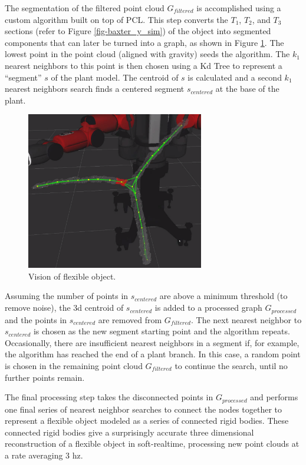 \documentclass[runningheads,a4paper]{llncs}
\begin{document}
The segmentation of the filtered point cloud $G_{filtered}$ is accomplished using a custom algorithm built on top of PCL. This step converts the $T_1$, $T_2$, and $T_3$ sections (refer to Figure \ref{fig-baxter_y_sim}) of the object into segmented components that can later be turned into a graph, as shown in Figure \ref{fig-vision}. The lowest point in the point cloud (aligned with gravity) seeds  the algorithm. The $k_1$ nearest neighbors to this point is then chosen using a Kd Tree to represent a “segment” $s$ of the plant model. The centroid of $s$ is calculated and a second $k_1$ nearest neighbors search finds a centered segment $s_{centered}$ at the base of the plant.

\begin{figure}[!htb]
\centering
\includegraphics[width = 220pt]{vision_component}
\caption{Vision of flexible object.}
\label{fig-vision}
\end{figure}

Assuming the number of points in $s_{centered}$ are above a minimum threshold (to remove noise), the 3d centroid of $s_{centered}$ is added to a processed graph $G_{processed}$ and the points in $s_{centered}$ are removed from $G_{filtered}$. The next nearest neighbor to $s_{centered}$ is chosen as the new segment starting point and the algorithm repeats. Occasionally, there are insufficient nearest neighbors in a segment if, for example, the algorithm has reached the end of a plant branch. In this case, a random point is chosen in the remaining point cloud $G_{filtered}$ to continue the search, until no further points remain.

The final processing step takes the disconnected points in $G_{processed}$ and performs one final series of nearest neighbor searches to connect the nodes together to represent a flexible object modeled as a series of connected rigid bodies. These connected rigid bodies give a surprisingly accurate three dimensional reconstruction of a flexible object in soft-realtime, processing new point clouds at a rate averaging 3 hz. %
\end{document}
